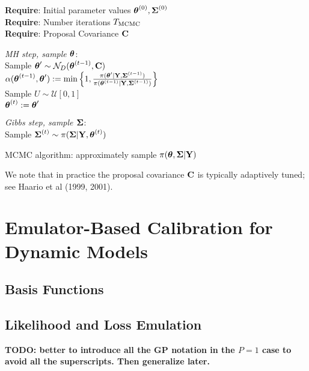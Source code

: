 \documentclass[12pt]{article}
\begin{document}
 \begin{algorithm}[H]
	\SetAlgoLined
	
	\textbf{Require}: Initial parameter values $\boldsymbol{\theta}^{(0)}, \boldsymbol{\Sigma}^{(0)}$ \\
	\textbf{Require}: Number iterations $T_{\text{MCMC}}$ \\
	\textbf{Require}: Proposal Covariance $\mathbf{C}$
		
	\bigskip
	
	 {
	\textit{MH step, sample $\boldsymbol{\theta}$}: \\[.2cm]
	Sample $\boldsymbol{\theta}^\prime \sim \mathcal{N}_{D}(\boldsymbol{\theta}^{(t - 1)}, \mathbf{C})$ \\
	$\alpha(\boldsymbol{\theta}^{(t - 1)}, \boldsymbol{\theta}^\prime) := \min\left\{1, \frac{\pi(\boldsymbol{\theta}^\prime|\mathbf{Y}, \boldsymbol{\Sigma}^{(t-1)})}{\pi(\boldsymbol{\theta}^{(t-1)}|\mathbf{Y}, \boldsymbol{\Sigma}^{(t-1)})} \right\}$ \\

	 Sample $U \sim \mathcal{U}[0, 1]$ \\
	  {
	 	$\boldsymbol{\theta}^{(t)} := \boldsymbol{\theta}^\prime$ \\
	 } 
	
	\bigskip
	
	\textit{Gibbs step, sample $\boldsymbol{\Sigma}$}: \\[.2cm]
	Sample $\boldsymbol{\Sigma}^{(t)} \sim  \pi(\boldsymbol{\Sigma} | \mathbf{Y}, \boldsymbol{\theta}^{(t)})$
}
\caption{MCMC algorithm: approximately sample $\pi(\boldsymbol{\theta}, \boldsymbol{\Sigma}|\mathbf{Y})$}
\end{algorithm}
We note that in practice the proposal covariance $\mathbf{C}$ is typically adaptively tuned; see Haario et al (1999, 2001).  

\section{Emulator-Based Calibration for Dynamic Models}

\subsection{Basis Functions}

\subsection{Likelihood and Loss Emulation}
\textbf{TODO: better to introduce all the GP notation in the $P = 1$ case to avoid all the superscripts. Then generalize later.}
\end{document}
